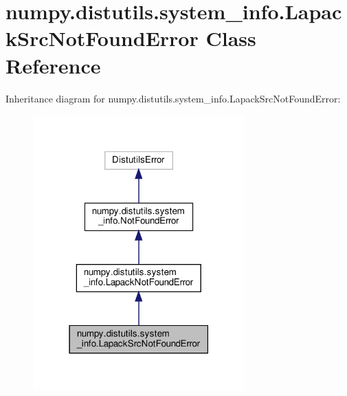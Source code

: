 \hypertarget{classnumpy_1_1distutils_1_1system__info_1_1LapackSrcNotFoundError}{}\section{numpy.\+distutils.\+system\+\_\+info.\+Lapack\+Src\+Not\+Found\+Error Class Reference}
\label{classnumpy_1_1distutils_1_1system__info_1_1LapackSrcNotFoundError}


Inheritance diagram for numpy.\+distutils.\+system\+\_\+info.\+Lapack\+Src\+Not\+Found\+Error\+:
\nopagebreak
\begin{figure}[H]
\begin{center}
\leavevmode
\includegraphics[width=231pt]{classnumpy_1_1distutils_1_1system__info_1_1LapackSrcNotFoundError__inherit__graph}
\end{center}
\end{figure}


